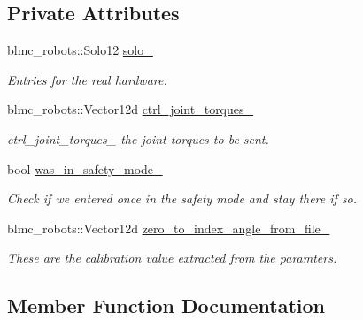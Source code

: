 \subsection*{Private Attributes}
\begin{DoxyCompactItemize}
\item 
blmc\+\_\+robots\+::\+Solo12 \hyperlink{classdg__blmc__robots_1_1DGMSolo12_a7c8edf5752598bafc7cd33380910e5ae}{solo\+\_\+}
\begin{DoxyCompactList}\small\item\em Entries for the real hardware. \end{DoxyCompactList}\item 
blmc\+\_\+robots\+::\+Vector12d \hyperlink{classdg__blmc__robots_1_1DGMSolo12_a8eaf78b77ea59bedbbcf23aabcdd66e0}{ctrl\+\_\+joint\+\_\+torques\+\_\+}
\begin{DoxyCompactList}\small\item\em ctrl\+\_\+joint\+\_\+torques\+\_\+ the joint torques to be sent. \end{DoxyCompactList}\item 
bool \hyperlink{classdg__blmc__robots_1_1DGMSolo12_a2a5156d24e66e1af93bc94f5f03ccb67}{was\+\_\+in\+\_\+safety\+\_\+mode\+\_\+}\hypertarget{classdg__blmc__robots_1_1DGMSolo12_a2a5156d24e66e1af93bc94f5f03ccb67}{}\label{classdg__blmc__robots_1_1DGMSolo12_a2a5156d24e66e1af93bc94f5f03ccb67}

\begin{DoxyCompactList}\small\item\em Check if we entered once in the safety mode and stay there if so. \end{DoxyCompactList}\item 
blmc\+\_\+robots\+::\+Vector12d \hyperlink{classdg__blmc__robots_1_1DGMSolo12_abb9b4edf8c97cfecbaf87b6adaad8ad5}{zero\+\_\+to\+\_\+index\+\_\+angle\+\_\+from\+\_\+file\+\_\+}
\begin{DoxyCompactList}\small\item\em These are the calibration value extracted from the paramters. \end{DoxyCompactList}\end{DoxyCompactItemize}


\subsection{Member Function Documentation}
